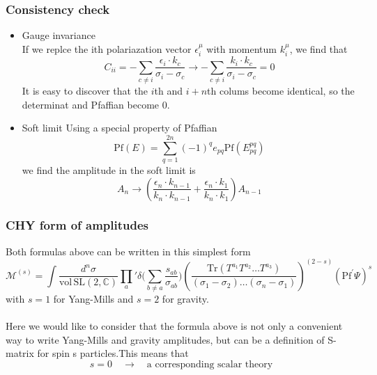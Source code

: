 \documentclass{beamer}
\begin{document}
\begin{frame}
    \frametitle{Consistency check}
    \begin{itemize}
        \item \alert{Gauge invariance}\\
        If we replce the ith polariazation vector $\epsilon_i^\mu$ with momentum $k_i^\mu$, we find that
        \begin{equation*}
            C_{ii}=-\sum_{c\neq i}\frac{\epsilon_i\cdot k_c}{\sigma_i-\sigma_c} \to -\sum_{c\neq i}\frac{k_i\cdot k_c}{\sigma_i-\sigma_c}=0
        \end{equation*}
        It is easy to discover that the $i$th and $i+n$th colums become identical, so the determinat and Pfaffian become 0.
        \pause
        \item \alert{Soft limit}
        Using a special property of Pfaffian
        \begin{equation*}
            \mathrm{Pf} (E)=\sum_{q=1}^{2n}(-1)^q e_{pq}\mathrm{Pf}(E^{pq}_{pq})
        \end{equation*}
        we find the amplitude in the soft limit is 
        \begin{equation*}
            A_n\to\left(\frac{\epsilon_n\cdot k_{n-1}}{k_n\cdot k_{n-1}}+\frac{\epsilon_n\cdot k_1}{k_n\cdot k_1}\right)A_{n-1}
        \end{equation*}
    \end{itemize}
\end{frame}
\begin{frame}
    \frametitle{CHY form of amplitudes}
    Both formulas above can be written in this simplest form 
    \alert{
        \begin{equation*}
            \!\!\!\!\mathcal{M}^{(s)}\!=\!\!\!\int\frac{d^n\sigma}{\mathrm{vol\,SL}(2,\mathbb{C})}\prod_a{'}\delta\bigg(\sum_{b\neq a}\frac{s_{ab}}{\sigma_{ab}}\bigg)
            \!\!\!\left(\frac{\mathrm{Tr}(T^{a_1}T^{a_2}\dots T^{a_3})}{(\sigma_1-\sigma_2)\dots (\sigma_n-\sigma_1)}\right)^{(2-s)}{(\mathrm{Pf}^\prime\Psi)}^s
        \end{equation*}}
    with $s=1$ for Yang-Mills and $s=2$ for gravity.
    \\ \hspace*{\fill}\\
    Here we would like to consider that the formula above is not only a convenient way to write Yang-Mills and gravity amplitudes, but can be \alert{a definition of S-matrix
    for spin s particles}.This means that 
    \begin{equation*}
        s=0\quad\to \quad \text{a corresponding scalar theory}
    \end{equation*}
\end{frame}
\end{document}
